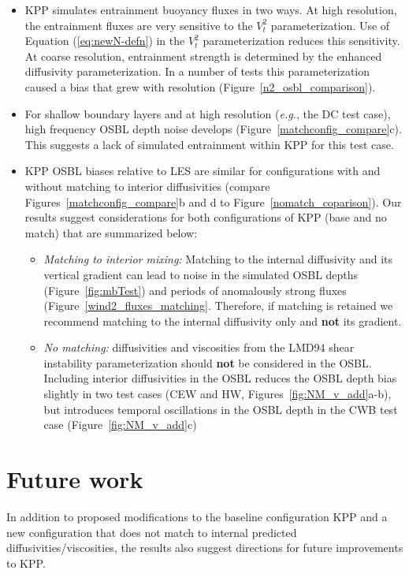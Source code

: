 \documentclass[preprint,12pt,authoryear]{agujournal}
\begin{document}
\begin{itemize}
\begin{itemize}
\item KPP simulates entrainment buoyancy fluxes in two ways.  At high resolution, the entrainment fluxes are very sensitive to the $V_t^2$ parameterization. Use of Equation (\ref{eq:newN-defn}) in the $V_t^2$ parameterization reduces this sensitivity. At coarse resolution, entrainment strength is determined by the enhanced diffusivity parameterization.  In a number of tests this parameterization caused a bias that grew with resolution (Figure~\ref{n2_osbl_comparison}).
\item For shallow boundary layers and at high resolution (\textit{e.g.}, the DC test case), high frequency OSBL depth noise develops (Figure~\ref{matchconfig_compare}c). This suggests a lack of simulated entrainment within KPP for this test case.
\item KPP OSBL biases relative to LES are similar for configurations with and without matching to interior diffusivities (compare Figures~\ref{matchconfig_compare}b and d to Figure~\ref{nomatch_coparison}).  Our results suggest considerations for both configurations of KPP (base and no match) that are summarized below:
\begin{itemize}
\item \textit{Matching to interior mixing:} Matching to the internal diffusivity and its vertical gradient can lead to noise in the simulated OSBL depths (Figure~\ref{fig:mbTest}) and periods of anomalously strong fluxes (Figure~\ref{wind2_fluxes_matching}.  Therefore, if matching is retained we recommend matching to the internal diffusivity only and \textbf{not} its gradient.
\item \textit{No matching:} diffusivities and viscosities from the LMD94 shear instability parameterization should \textbf{not} be considered in the OSBL.  Including interior diffusivities in the OSBL reduces the OSBL depth bias slightly in two test cases (CEW and HW, Figures~\ref{fig:NM_v_add}a-b), but introduces temporal oscillations in the OSBL depth in the CWB test case (Figure~\ref{fig:NM_v_add}c)
\end{itemize}
\end{itemize}
\end{itemize}

\section{Future work}
\label{section:futureWork}
In addition to proposed modifications to the baseline configuration KPP and a new configuration that does not match to internal predicted diffusivities/viscosities, the results also suggest directions for future improvements to KPP.
\end{document}
